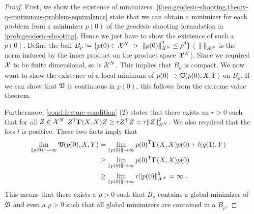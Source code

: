 \begin{proof}
	First, we show the existence of minimizers:
	\cref{theo:geodesic-shooting,theo:v-q-continuous-problem-equivalence} state that we can obtain a minimizer for each problem from a minimizer $p(0)$ of the geodesic shooting formulation in \cref{prob:geodesic-shooting}.
	Hence we just have to show the existence of such a $p(0)$.
	Define the ball $B_\rho \coloneqq \{p(0) \in \mathcal{X}^N\ > \ \norm{p(0)}_{\mathcal{X}^N}^2 \leq \rho^2 \}$ ( $\norm{\cdot}_{\mathcal{X}^N}$ is the norm induced by the inner product on the product space $\mathcal{X}^N$).
	Since we required $\mathcal{X}$ to be finite dimensional, so is $\mathcal{X}^N$.
	This implies that $B_\rho$ is compact.
	We now want to show the existence of a local minimum of $p(0) \rightarrow \mathfrak{V}(p(0), X, Y)$ on $B_\rho$.
	If we can show that $\mathfrak{V}$ is continuous in $p(0)$, this follows from the extreme value theorem.
	
	Furthermore, \cref{cond:feature-condition} (2) states that there exists an $r > 0$ such that for all $Z \in \mathcal{X}^N$ $Z^{\mathrm{T}} \mathbf{\Gamma}(X, X) Z \geq r Z^{\mathrm{T}} Z = r \norm{Z}_{\mathcal{X}^N}^2$.
	We also required that the loss $l$ is positive.
	These two facts imply that
	\begin{align}
		\lim_{\norm{p(0)} \rightarrow \infty} \mathfrak{V}(p(0), X, Y) 
		&= \lim_{\norm{p(0)} \rightarrow \infty} p(0)^{\mathrm{T}} \mathbf{\Gamma}(X, X) p(0) + l(q(1), Y)\\
		& \geq 	\lim_{\norm{p(0)} \rightarrow \infty} p(0)^{\mathrm{T}} \mathbf{\Gamma}(X, X) p(0) \\
		& \geq \lim_{\norm{p(0)} \rightarrow \infty} r \norm{p(0)}_{\mathcal{X}^N}^2
		= \infty \ .
	\end{align}
	This means that there exists a $\rho > 0$ such that $B_\rho$ contains a global minimizer of $\mathfrak{V}$ and even a $\rho > 0$ such that all global minimizers are contained in a $B_\rho$.
	

\end{proof}
